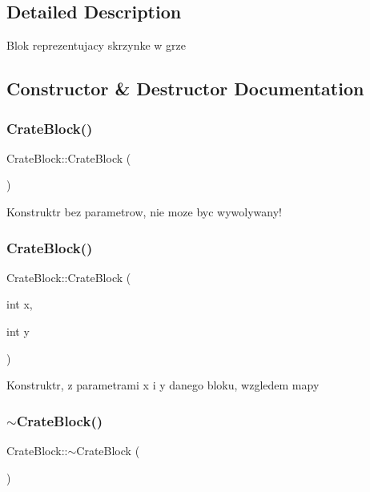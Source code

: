 \subsection{Detailed Description}
Blok reprezentujacy skrzynke w grze 

\subsection{Constructor \& Destructor Documentation}
\mbox{\label{class_crate_block_a1a5d0818a3b1a878b7183b27461bcde4}} 
\subsubsection{\texorpdfstring{Crate\+Block()}{CrateBlock()}\hspace{0.1cm}{\footnotesize\ttfamily [1/2]}}
{\footnotesize\ttfamily Crate\+Block\+::\+Crate\+Block (\begin{DoxyParamCaption}{ }\end{DoxyParamCaption})}

Konstruktr bez parametrow, nie moze byc wywolywany! \mbox{\label{class_crate_block_af425285a43dc8a3eaf63a1abf91987cf}} 
\subsubsection{\texorpdfstring{Crate\+Block()}{CrateBlock()}\hspace{0.1cm}{\footnotesize\ttfamily [2/2]}}
{\footnotesize\ttfamily Crate\+Block\+::\+Crate\+Block (\begin{DoxyParamCaption}\item[{int}]{x,  }\item[{int}]{y }\end{DoxyParamCaption})}

Konstruktr, z parametrami x i y danego bloku, wzgledem mapy \mbox{\label{class_crate_block_aa853be5155fd0094454b2f25fb24c719}} 
\subsubsection{\texorpdfstring{$\sim$\+Crate\+Block()}{~CrateBlock()}}
{\footnotesize\ttfamily Crate\+Block\+::$\sim$\+Crate\+Block (\begin{DoxyParamCaption}{ }\end{DoxyParamCaption})}

